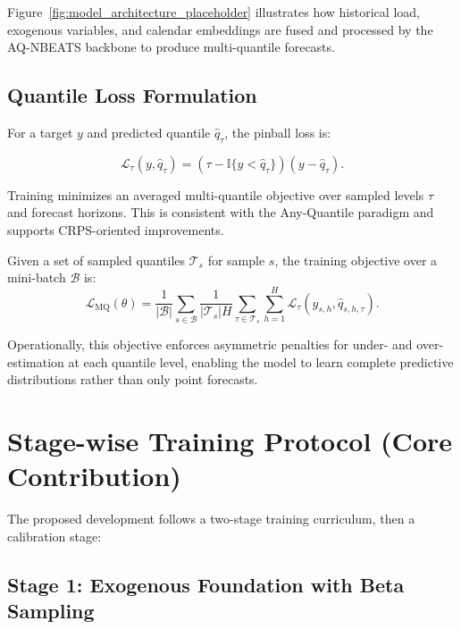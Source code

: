 Figure~\ref{fig:model_architecture_placeholder} illustrates how historical
load, exogenous variables, and calendar embeddings are fused and processed by
the AQ-NBEATS backbone to produce multi-quantile forecasts.

\subsection{Quantile Loss Formulation}
\label{subsec:quantile_loss}

For a target $y$ and predicted quantile $\hat{q}_{\tau}$, the pinball loss is:

\begin{equation}
\mathcal{L}_{\tau}(y, \hat{q}_{\tau}) =
(\tau - \mathbb{I}\{y < \hat{q}_{\tau}\})(y - \hat{q}_{\tau}).
\label{eq:pinball_method}
\end{equation}

Training minimizes an averaged multi-quantile objective over sampled levels
$\tau$ and forecast horizons. This is consistent with the Any-Quantile
paradigm and supports CRPS-oriented improvements.

Given a set of sampled quantiles $\mathcal{T}_s$ for sample $s$, the training
objective over a mini-batch $\mathcal{B}$ is:
\begin{equation}
\mathcal{L}_{\mathrm{MQ}}(\theta)=
\frac{1}{|\mathcal{B}|}
\sum_{s\in\mathcal{B}}
\frac{1}{|\mathcal{T}_s|H}
\sum_{\tau\in\mathcal{T}_s}\sum_{h=1}^{H}
\mathcal{L}_{\tau}(y_{s,h},\hat{q}_{s,h,\tau}).
\label{eq:mq_loss}
\end{equation}

Operationally, this objective enforces asymmetric penalties for under- and
over-estimation at each quantile level, enabling the model to learn complete
predictive distributions rather than only point forecasts.

\section{Stage-wise Training Protocol (Core Contribution)}
\label{sec:stage_protocol}

The proposed development follows a two-stage training curriculum,
then a calibration stage:

\subsection{Stage 1: Exogenous Foundation with Beta Sampling}
\label{subsec:stage1}

